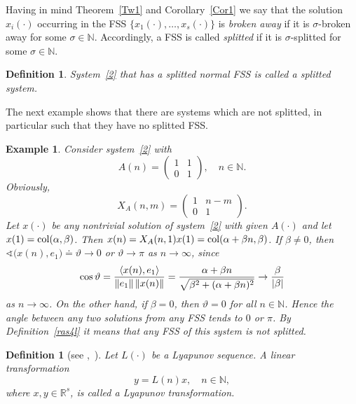\documentclass[11pt]{article}
\newtheorem{definition}[theorem]{Definition}
\newtheorem{example}[theorem]{Example}
\begin{document}
Having in mind Theorem~\ref{Tw1} and Corollary~\ref{Cor1} we say that the
solution $x_{i}(\cdot )$ occurring in the FSS $\bigl\{x_{1}(\cdot ),\dots
,x_{s}(\cdot )\bigr\}$ is \emph{broken away} if it is $\sigma $-broken
away for some $\sigma \in \mathbb{N}$. Accordingly, a FSS is called \emph{%
splitted} if it is $\sigma $-splitted for some $\sigma \in \mathbb{N}$.

\begin{definition}
System~\eqref{2} that has a splitted normal FSS is called  
\emph{a splitted system}.
\end{definition}

The next example shows that there are systems which are not splitted, in
particular such that they have no splitted FSS.

\begin{example}
\textrm{Consider system~\eqref{2} with 
\begin{equation*}
A( n) = 
\begin{pmatrix}
1 & 1 \\ 
0 & 1%
\end{pmatrix}%
,\quad n\in \mathbb{N}.
\end{equation*}%
Obviously,%
\begin{equation*}
X_{A}( n,m) =%
\begin{pmatrix}
1 & n-m \\ 
0 & 1%
\end{pmatrix}%
.
\end{equation*}
Let $x(\cdot)$ be any nontrivial solution of system~\eqref{2} with given $%
A(\cdot)$ and let $x(1)=\mathop{\rm col}(\alpha,\beta)$. Then $%
x(n)=X_A(n,1)x(1)=\mathop{\rm col}(\alpha+\beta n,\beta)$. If $\beta\ne 0$,
then $\sphericalangle\bigl(x(n),e_1\bigr)\doteq\vartheta\to 0$ or $%
\vartheta\to\pi$ as $n\to\infty$, since 
\begin{equation*}
\cos\vartheta=\frac{\langle x(n),e_1\rangle}{\|e_1\|\,\|x(n)\|}=\frac{%
\alpha+\beta n}{\sqrt{\beta^2+(\alpha+\beta n)^2}}\to \frac{\beta}{|\beta|}
\end{equation*}
as $n\to\infty$. On the other hand, if $\beta=0$, then $\vartheta=0$ for all 
$n\in\mathbb{N}$. Hence the angle between any two solutions from any FSS
tends to $0$ or $\pi$. By Definition~\ref{ras4l} it means that any FSS of
this system is not splitted.}
\end{example}

\begin{definition}[{see \protect\cite[p.]{Halanay},\,%
\protect\cite[p.]{GAI}}]
\textrm{Let $L(\cdot)$ be a Lyapunov sequence. A linear transformation 
\begin{equation}
y=L(n)x,\quad n\in \mathbb{N},  \label{LyapTr}
\end{equation}%
where $x,y\in\mathbb{R}^{s}$, is called} 
\emph{a Lyapunov transformation.}
\end{definition}
\end{document}
